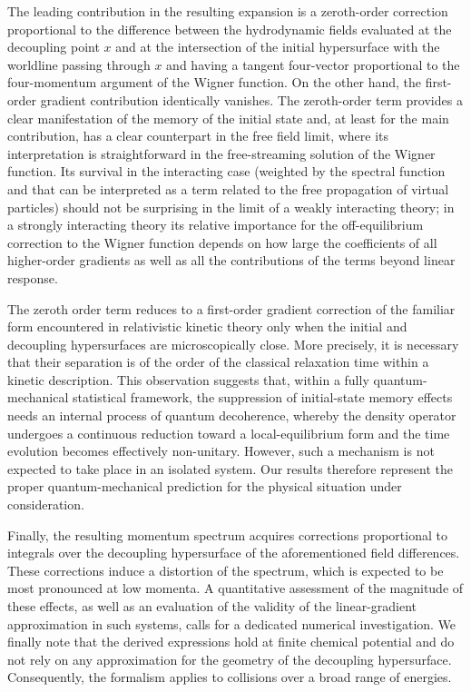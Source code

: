 \documentclass[prd,superscriptaddress,nofootinbib,notitlepage]{revtex4-1}
\begin{document}
The leading contribution in the resulting expansion is a zeroth-order correction proportional to the difference between the hydrodynamic 
fields evaluated at the decoupling point $x$ and at the intersection of the initial hypersurface with the worldline passing through 
$x$ and having a tangent four-vector proportional to the four-momentum argument of the Wigner function. On the other hand, the 
first-order gradient contribution identically vanishes. The zeroth-order term provides a clear manifestation of the memory 
of the initial state and, at least for the main contribution, has a clear counterpart in the free field limit, where its interpretation is straightforward in the free-streaming solution of the Wigner function. Its survival in the interacting case (weighted by the spectral 
function and that can be interpreted as a term related to the free propagation of virtual particles) should not be surprising in
the limit of a weakly interacting theory; in a strongly interacting theory its relative importance for the off-equilibrium correction 
to the Wigner function depends on how large the coefficients of all higher-order gradients as well as all the contributions of the 
terms beyond linear response.

The zeroth order term reduces to a first-order gradient correction of the familiar form encountered in relativistic kinetic theory only 
when the initial and decoupling hypersurfaces are microscopically close. More precisely, it is necessary that their separation is of the 
order of the classical relaxation time within a kinetic description. This observation suggests that, within a fully quantum-mechanical 
statistical framework, the suppression of initial-state memory effects needs an internal process of quantum decoherence, 
whereby the density operator undergoes a continuous reduction toward a local-equilibrium form and the time evolution becomes effectively 
non-unitary. However, such a mechanism is not expected to take place in an isolated system. Our results therefore represent the proper 
quantum-mechanical prediction for the physical situation under consideration.

Finally, the resulting momentum spectrum acquires corrections proportional to integrals over the decoupling hypersurface of the 
aforementioned field differences. These corrections induce a distortion of the spectrum, which is expected to be most pronounced at 
low momenta. A quantitative assessment of the magnitude of these effects, as well as an evaluation of the validity of the 
linear-gradient approximation in such systems, calls for a dedicated numerical investigation. We finally note that the derived 
expressions hold at finite chemical potential and do not rely on any approximation for the geometry of the decoupling 
hypersurface. Consequently, the formalism applies to collisions over a broad range of energies.
\end{document}
